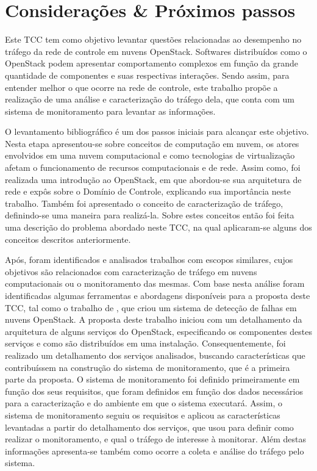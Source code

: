 \chapter{Considerações \& Próximos passos}
\label{cap:conclusao}
Este TCC tem como objetivo levantar questões relacionadas ao desempenho no tráfego da rede de controle em nuvens OpenStack.
%
Softwares distribuídos como o OpenStack podem apresentar comportamento complexos em função da grande quantidade de componentes e suas respectivas interações.
%
Sendo assim, para entender melhor o que ocorre na rede de controle, este trabalho propõe a realização de uma análise e caracterização do tráfego dela, que conta com um sistema de monitoramento para levantar as informações.

O levantamento bibliográfico é um dos passos iniciais para alcançar este objetivo.
%
Nesta etapa apresentou-se sobre conceitos de computação em nuvem, os atores envolvidos em uma nuvem computacional e como tecnologias de virtualização afetam o funcionamento de recursos computacionais e de rede.
%
Assim como, foi realizada uma introdução ao OpenStack, em que abordou-se sua arquitetura de rede e expôs sobre o Domínio de Controle, explicando sua importância neste trabalho.
%
Também foi apresentado o conceito de caracterização de tráfego, definindo-se uma maneira para realizá-la.
%
Sobre estes conceitos então foi feita uma descrição do problema abordado neste TCC, na qual aplicaram-se alguns dos conceitos descritos anteriormente.

Após, foram identificados e analisados trabalhos com escopos similares, cujos objetivos são relacionados com caracterização de tráfego em nuvens computacionais ou o monitoramento das mesmas.
%
Com base nesta análise foram identificadas algumas ferramentas e abordagens disponíveis para a proposta deste TCC, tal como o trabalho de \cite{sharma:2015:hansel}, que criou um sistema de detecção de falhas em nuvens OpenStack.
%
A proposta deste trabalho iniciou com um detalhamento da arquitetura de alguns serviços do OpenStack, especificando os componentes destes serviços e como são distribuídos em uma instalação.
%
Consequentemente, foi realizado um detalhamento dos serviços analisados, buscando características que contribuíssem na construção do sistema de monitoramento, que é a primeira parte da proposta.
%
O sistema de monitoramento foi definido primeiramente em função dos seus requisitos, que foram definidos em função dos dados necessários para a caracterização e do ambiente em que o sistema executará.
%
Assim, o sistema de monitoramento seguiu os requisitos e aplicou as características levantadas a partir do detalhamento dos serviços, que usou para definir como realizar o monitoramento, e qual o tráfego de interesse à monitorar.
%
Além destas informações apresenta-se também como ocorre a coleta e análise do tráfego pelo sistema.

